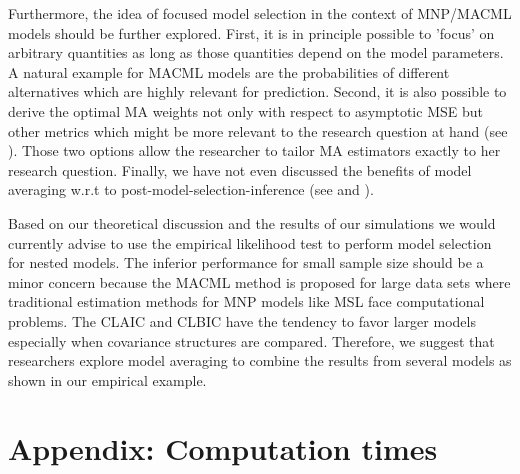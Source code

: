 \documentclass[12pt, a4paper]{article}
\numberwithin{defcounter}{section}
\numberwithin{excounter}{section}
\begin{document}
Furthermore, the idea of focused model selection in the context of \ac{MNP}/\ac{MACML} models should be further explored. First, it is in principle possible to 'focus' on arbitrary quantities as long as those quantities depend on the model parameters. A natural example for \ac{MACML} models are the probabilities of different alternatives which are highly relevant for prediction. Second, it is also possible to derive the optimal \ac{MA} weights not only with respect to asymptotic \ac{MSE} but other metrics which might be more relevant to the research question at hand (see \cite{claeskens2006}). Those two options allow the researcher to tailor \ac{MA} estimators exactly to her research question. Finally, we have not even discussed the benefits of model averaging w.r.t to post-model-selection-inference (see \cite[199ff]{claeskens2008} and \cite{leeb2005}).

Based on  our theoretical discussion and the results of our simulations we would currently advise to use the empirical likelihood test to perform model selection for nested models. The inferior performance for small sample size should be a minor concern because the \ac{MACML} method is proposed for large data sets where traditional estimation methods for \ac{MNP} models like \ac{MSL} face computational problems. The \ac{CLAIC} and \ac{CLBIC} have the tendency to favor larger models especially when covariance structures are compared. Therefore, we suggest that researchers explore model averaging to combine the results from several models as shown in our empirical example. 



\clearpage


\section*{Appendix: Computation times} 
\end{document}
